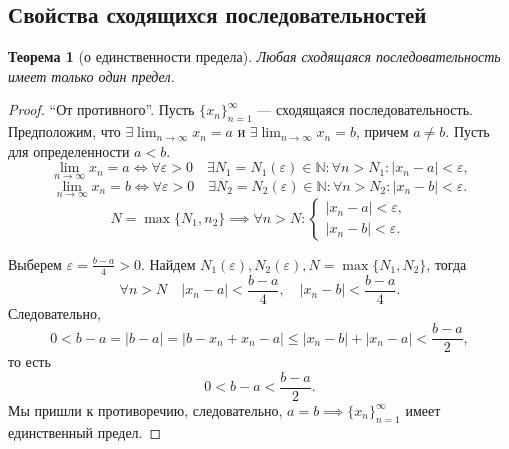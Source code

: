 \documentclass[a4paper,12pt]{article} %
\newtheorem{theorem}{Теорема}[section]
\theoremstyle{remark}
\theoremstyle{definition}
\begin{document}
\subsection{Свойства сходящихся последовательностей}
\begin{theorem}[о единственности предела]
	Любая сходящаяся последовательность имеет только один предел.	
\end{theorem}
\begin{proof}
	``От противного''. Пусть $\{x_n\}_{n=1}^{\infty}$ --- сходящаяся последовательность. Предположим, что 
    $\displaystyle \exists \lim_{n \to \infty} x_{n} = a$ и $\displaystyle \exists \lim_{n \to \infty} x_{n} = b$,
    причем $a\neq b$.
    Пусть для определенности $a<b$.
	\[
	\lim_{n \to \infty} x_{n} = a \iff \forall \varepsilon>0 \quad \exists N_1=N_1(\varepsilon)\in \mathbb{N} : \forall n>N_1 : |x_{n}-a|<\varepsilon
	,\] 
	\[
	\lim_{n \to \infty} x_{n} = b \iff \forall \varepsilon>0 \quad \exists N_2=N_2(\varepsilon)\in \mathbb{N} : \forall n>N_2 : |x_{n}-b|<\varepsilon
	.\] 
	\[
		N = \max\{N_1, n_2\} \implies \forall n>N : 
		\begin{cases}
			|x_{n}-a| < \varepsilon, \\
			|x_{n}-b| < \varepsilon.
		\end{cases}
	\] 
\begin{center}
\end{center}
Выберем $\displaystyle\varepsilon = \frac{b-a}{4} > 0$. Найдем $N_1(\varepsilon), N_2(\varepsilon), N=\max\{N_1, N_2\}$, тогда
\[
	\forall n>N \quad |x_{n}-a| < \frac{b-a}{4}, \quad |x_{n}-b| < \frac{b-a}{4}
.\] 
Следовательно,
\[
	0 < b-a = |b-a| = |b-x_{n}+x_{n}-a| \le |x_{n}-b|+|x_{n}-a| < \frac{b-a}{2}
,\] 
то есть
\[
0 < b-a < \frac{b-a}{2}
.\] 
Мы пришли к противоречию, следовательно, $a=b \implies \{x_n\}_{n=1}^{\infty}$ имеет единственный предел.
\end{proof}
\end{document}

